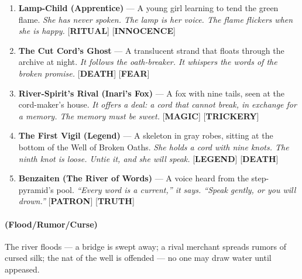 \begin{enumerate}
\item \textbf{Lamp-Child (Apprentice)} --- A young girl learning to tend the green flame.
  \hfill \textit{She has never spoken. The lamp is her voice. The flame flickers when she is happy.} [\textbf{RITUAL}] [\textbf{INNOCENCE}]
\item[J] \textbf{The Cut Cord's Ghost} --- A translucent strand that floats through the archive at night.
  \hfill \textit{It follows the oath-breaker. It whispers the words of the broken promise.} [\textbf{DEATH}] [\textbf{FEAR}]
\item[Q] \textbf{River-Spirit's Rival (Inari's Fox)} --- A fox with nine tails, seen at the cord-maker's house.
  \hfill \textit{It offers a deal: a cord that cannot break, in exchange for a memory. The memory must be sweet.} [\textbf{MAGIC}] [\textbf{TRICKERY}]
\item[K] \textbf{The First Vigil (Legend)} --- A skeleton in gray robes, sitting at the bottom of the Well of Broken Oaths.
  \hfill \textit{She holds a cord with nine knots. The ninth knot is loose. Untie it, and she will speak.} [\textbf{LEGEND}] [\textbf{DEATH}]
\item[A] \textbf{Benzaiten (The River of Words)} --- A voice heard from the step-pyramid's pool.
  \hfill \textit{``Every word is a current,'' it says. ``Speak gently, or you will drown.''} [\textbf{PATRON}] [\textbf{TRUTH}]
\end{enumerate}

\paragraph*{(Flood/Rumor/Curse)} The river floods --- a bridge is swept away; a rival merchant spreads rumors of cursed silk; the nat of the well is offended --- no one may draw water until appeased.

